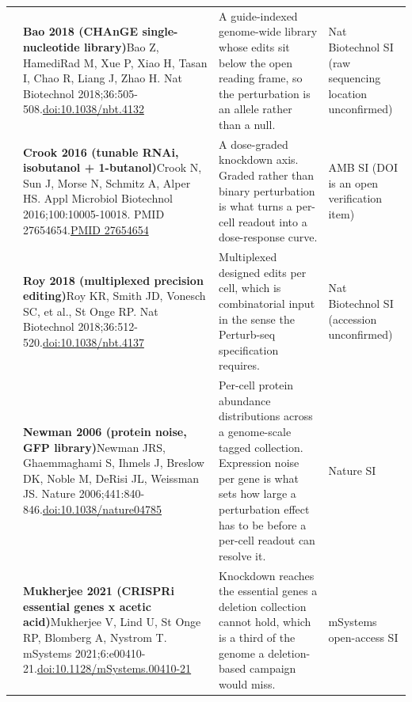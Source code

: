 \begin{landscape}
\begin{longtable}{@{}r@{\hspace{4pt}} L{86mm} L{92mm} L{62mm}@{}}
 & \textbf{Bao 2018 (CHAnGE single-nucleotide library)}\newline Bao Z, HamediRad M, Xue P, Xiao H, Tasan I, Chao R, Liang J, Zhao H. Nat Biotechnol 2018;36:505-508.\newline \href{https://doi.org/10.1038/nbt.4132}{doi:10.1038/\allowbreak nbt.4132} & A guide-indexed genome-wide library whose edits sit below the open reading frame, so the perturbation is an allele rather than a null. & Nat Biotechnol SI (raw sequencing location unconfirmed) \\
 & \textbf{Crook 2016 (tunable RNAi, isobutanol + 1-butanol)}\newline Crook N, Sun J, Morse N, Schmitz A, Alper HS. Appl Microbiol Biotechnol 2016;100:10005-10018. PMID 27654654.\newline \href{https://pubmed.ncbi.nlm.nih.gov/27654654/}{PMID 27654654} & A dose-graded knockdown axis. Graded rather than binary perturbation is what turns a per-cell readout into a dose-response curve. & AMB SI (DOI is an open verification item) \\
 & \textbf{Roy 2018 (multiplexed precision editing)}\newline Roy KR, Smith JD, Vonesch SC, et al., St Onge RP. Nat Biotechnol 2018;36:512-520.\newline \href{https://doi.org/10.1038/nbt.4137}{doi:10.1038/\allowbreak nbt.4137} & Multiplexed designed edits per cell, which is combinatorial input in the sense the Perturb-seq specification requires. & Nat Biotechnol SI (accession unconfirmed) \\
 & \textbf{Newman 2006 (protein noise, GFP library)}\newline Newman JRS, Ghaemmaghami S, Ihmels J, Breslow DK, Noble M, DeRisi JL, Weissman JS. Nature 2006;441:840-846.\newline \href{https://doi.org/10.1038/nature04785}{doi:10.1038/\allowbreak nature04785} & Per-cell protein abundance distributions across a genome-scale tagged collection. Expression noise per gene is what sets how large a perturbation effect has to be before a per-cell readout can resolve it. & Nature SI \\
 & \textbf{Mukherjee 2021 (CRISPRi essential genes x acetic acid)}\newline Mukherjee V, Lind U, St Onge RP, Blomberg A, Nystrom T. mSystems 2021;6:e00410-21.\newline \href{https://doi.org/10.1128/mSystems.00410-21}{doi:10.1128/\allowbreak mSystems.00410-21} & Knockdown reaches the essential genes a deletion collection cannot hold, which is a third of the genome a deletion-based campaign would miss. & mSystems open-access SI \\

\end{longtable}
\end{landscape}
